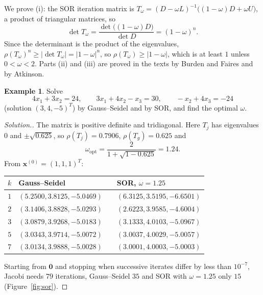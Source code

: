 \documentclass[11pt,a4paper]{article}
\numberwithin{equation}{section}
\theoremstyle{definition}
\newtheorem{exa}[thm]{Example}
\newenvironment{solution}
  {\renewcommand{\qedsymbol}{}\begin{proof}[\textit{Solution}.]}
  {\end{proof}}
\begin{document}
We prove (i): the SOR iteration matrix is $T_\omega = (D-\omega L)^{-1}\bigl((1-\omega)D+\omega U\bigr)$, a product of triangular matrices, so
$$\det T_\omega = \frac{\det\bigl((1-\omega)D\bigr)}{\det D} = (1-\omega)^n .$$
Since the determinant is the product of the eigenvalues, $\rho(T_\omega)^n\geq|\det T_\omega| = |1-\omega|^n$, so $\rho(T_\omega)\geq|1-\omega|$, which
is at least $1$ unless $0<\omega<2$. Parts (ii) and (iii) are proved in the texts by Burden and Faires and by Atkinson.

\begin{exa}
\label{exa:sor}
Solve
$$4x_1+3x_2 = 24,\qquad 3x_1+4x_2-x_3 = 30,\qquad -x_2+4x_3 = -24$$
(solution $(3,4,-5)^T$) by Gauss--Seidel and by SOR, and find the optimal $\omega$.
\end{exa}

\begin{solution}
The matrix is positive definite and tridiagonal. Here $T_j$ has eigenvalues $0$ and $\pm\sqrt{0.625}$, so $\rho(T_j) = 0.7906$,
$\rho(T_g) = 0.625$ and
$$\omega_{\text{opt}} = \frac{2}{1+\sqrt{1-0.625}} = 1.24 .$$
From $\mathbf x^{(0)} = (1,1,1)^T$:
\begin{center}
\begin{tabular}{rlll}
\hline
$k$ & Gauss--Seidel & & SOR, $\omega = 1.25$\\
\hline
$1$ & $(5.2500, 3.8125, -5.0469)$ & & $(6.3125, 3.5195, -6.6501)$\\
$2$ & $(3.1406, 3.8828, -5.0293)$ & & $(2.6223, 3.9585, -4.6004)$\\
$3$ & $(3.0879, 3.9268, -5.0183)$ & & $(3.1333, 4.0103, -5.0967)$\\
$5$ & $(3.0343, 3.9714, -5.0072)$ & & $(3.0037, 4.0029, -5.0057)$\\
$7$ & $(3.0134, 3.9888, -5.0028)$ & & $(3.0001, 4.0003, -5.0003)$\\
\hline
\end{tabular}
\end{center}
Starting from $\mathbf 0$ and stopping when successive iterates differ by less than $10^{-7}$, Jacobi needs $79$ iterations, Gauss--Seidel
$35$ and SOR with $\omega = 1.25$ only $15$ (Figure~\ref{fig:sor}).
\end{solution}
\end{document}
